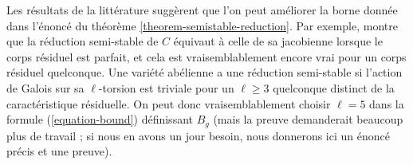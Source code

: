 \begin{remark}
\label{remark-improving-bound}
Les résultats de la littérature suggèrent que l'on peut améliorer la borne
donnée dans l'énoncé du théorème \ref{theorem-semistable-reduction}.
Par exemple, \cite{DM} montre que la réduction semi-stable de $C$ équivaut
à celle de sa jacobienne lorsque le corps résiduel est parfait, et cela est
vraisemblablement encore vrai pour un corps résiduel quelconque.
Une variété abélienne a une réduction semi-stable si l'action de Galois sur
sa $\ell$-torsion est triviale pour un $\ell\geq3$ quelconque distinct de
la caractéristique résiduelle. On peut donc vraisemblablement choisir
$\ell=5$ dans la formule (\ref{equation-bound}) définissant $B_g$ (mais la
preuve demanderait beaucoup plus de travail ; si nous en avons un jour
besoin, nous donnerons ici un énoncé précis et une preuve).
\end{remark}











